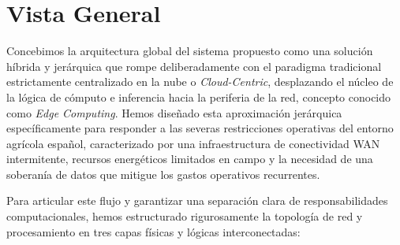 \section{Vista General}

Concebimos la arquitectura global del sistema propuesto como una solución híbrida y jerárquica que rompe deliberadamente con el paradigma tradicional estrictamente centralizado en la nube o \textit{Cloud-Centric}, desplazando el núcleo de la lógica de cómputo e inferencia hacia la periferia de la red, concepto conocido como \textit{Edge Computing}. Hemos diseñado esta aproximación jerárquica específicamente para responder a las severas restricciones operativas del entorno agrícola español, caracterizado por una infraestructura de conectividad WAN intermitente, recursos energéticos limitados en campo y la necesidad de una soberanía de datos que mitigue los gastos operativos recurrentes.

Para articular este flujo y garantizar una separación clara de responsabilidades computacionales, hemos estructurado rigurosamente la topología de red y procesamiento en tres capas físicas y lógicas interconectadas:

